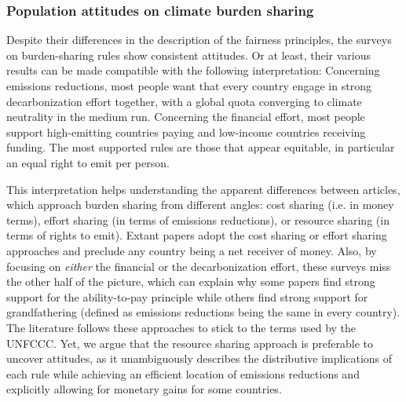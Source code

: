 \subsubsection{Population attitudes on climate burden sharing}\label{subsubsec:literature_attitudes_burden_sharing}

Despite their differences in the description of the fairness principles, the surveys on burden-sharing rules show consistent attitudes. Or at least, their various results can be made compatible with the following interpretation: 
Concerning emissions reductions, most people want that every country engage in strong decarbonization effort together, with a global quota converging to climate neutrality in the medium run. Concerning the financial effort, most people support high-emitting countries paying and low-income countries receiving funding. The most supported rules are those that appear equitable, in particular an equal right to emit per person. 

This interpretation helps understanding the apparent differences between articles, which approach burden sharing from different angles: cost sharing (i.e. in money terms), effort sharing (in terms of emissions reductions), or resource sharing (in terms of rights to emit). Extant papers adopt the cost sharing or effort sharing approaches and preclude any country being a net receiver of money. Also, by focusing on \textit{either} the financial or the decarbonization effort, these surveys miss the other half of the picture, which can explain why some papers find strong support for the ability-to-pay principle while others find strong support for grandfathering (defined as emissions reductions being the same in every country). The literature follows these approaches to stick to the terms used by the UNFCCC. Yet, we argue that the resource sharing approach is preferable to uncover attitudes, as it unambiguously describes the distributive implications of each rule while achieving an efficient location of emissions reductions and explicitly allowing for monetary gains for some countries. %

